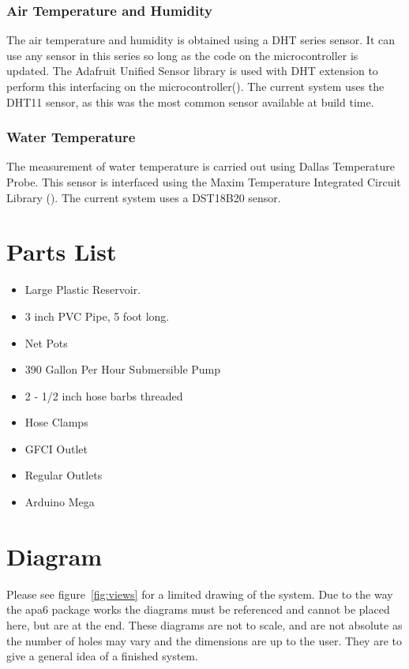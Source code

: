 \documentclass[american,12pt]{article}
\begin{document}
\subsubsection{Air Temperature and Humidity}
The air temperature and humidity is obtained using a DHT series sensor. It can
use any sensor in this series so long as the code on the microcontroller is
updated. The Adafruit Unified Sensor library is used with DHT extension to
perform this interfacing on the
microcontroller(\cite{adafruit-unified-sensor,adafruit-dht}). The current system
uses the DHT11 sensor, as this was the most common sensor available at build
time.

\subsubsection{Water Temperature}
The measurement of water temperature is carried out using Dallas Temperature
Probe. This sensor is interfaced using the Maxim Temperature Integrated Circuit
Library (\cite{gh-arduino-temperature}). The current system uses
a DST18B20 sensor.

\section{Parts List}
\begin{itemize}
    \item Large Plastic Reservoir.
    \item 3 inch PVC Pipe, 5 foot long.
    \item Net Pots
    \item 390 Gallon Per Hour Submersible Pump
    \item 2 - 1/2 inch hose barbs threaded
    \item Hose Clamps
    \item GFCI Outlet
    \item Regular Outlets
    \item Arduino Mega
\end{itemize}

\section{Diagram}
Please see figure~\ref{fig:views} for a limited drawing of the system.
Due to the way the apa6 package works the
diagrams must be referenced and cannot be placed here, but are at the end. These
diagrams are not to scale, and are not absolute as the number of holes may vary
and the dimensions are up to the user. They are to give a general idea of a
finished system.
\end{document}
